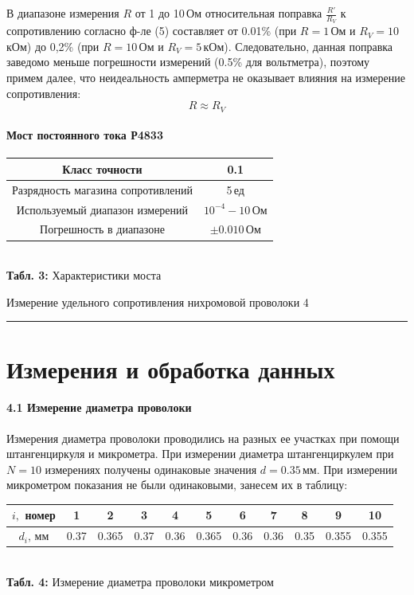 \documentclass[12pt,a4paper]{scrartcl}
\begin{document}
	\medskip В диапазоне измерения $R$ от 1 до 10$\,$Ом относительная поправка $\frac{R'}{R_V}$ к сопротивлению согласно ф-ле (5) составляет от 0.01\% (при $R = 1\,$Ом и $R_V = 10$кОм) до 0,2\% (при $R = 10\,$Ом и
	$R_V = 5\,$кОм). Следовательно, данная поправка заведомо меньше погрешности измерений (0.5\% для вольтметра), поэтому примем далее, что неидеальность амперметра не оказывает влияния на измерение сопротивления:
	\begin{equation}
		R \approx R_V
	\end{equation}

	\paragraph{Мост постоянного тока Р4833} \hfill
	\begin{center}
		\begin{tabular}{|c|c|}
			\hline Класс точности & 0.1
			\\\hline Разрядность магазина сопротивлений & 5$\,$ед
			\\\hline Используемый диапазон измерений & $10^{-4} - 10\,$Ом
			\\\hline Погрешность в диапазоне & $\pm0.010\,$Ом
			\\\hline
		\end{tabular}
		\\\textbf{Табл. 3:} Характеристики моста
	\end{center}
	
	\newpage
	\begin{flushleft}
		\footnotesize{Измерение удельного сопротивления нихромовой проволоки} \hspace{\fill} \footnotesize{4}
		\\[-0.3cm]\noindent\rule{\textwidth}{0.3pt}
	\end{flushleft}
	
	\section{Измерения и обработка данных}
	
	
	\paragraph{4.1 Измерение диаметра проволоки} \hfill
	\par Измерения диаметра проволоки проводились на разных ее участках при помощи штангенциркуля и микрометра. При измерении диаметра штангенциркулем при $N = 10$ измерениях получены одинаковые значения $d = 0.35\,$мм. При измерении микрометром показания не были одинаковыми, занесем их в таблицу:
	\begin{center}
		\begin{tabular}{|c|c|c|c|c|c|c|c|c|c|c|}
			\hline $i,$ номер & 1 & 2 & 3 & 4 & 5 & 6 & 7 & 8 & 9 & 10
			\\\hline $d_i,\,$мм & 0.37 & 0.365 & 0.37 & 0.36 & 0.365 & 0.36 & 0.36 & 0.35 & 0.355 & 0.355
			\\\hline 
		\end{tabular}
		\\\textbf{Табл. 4:} Измерение диаметра проволоки микрометром 
	\end{center}
	
\end{document}
